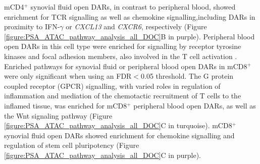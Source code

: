 mCD4$^+$ synovial fluid open DARs, in contrast to peripheral blood, showed enrichment for TCR signalling as well as chemokine signalling,including DARs in proximity to IFN-$\gamma$ or \textit{CXCL13} and \textit{CXCR6}, respectively (Figure \ref{figure:PSA_ATAC_pathway_analysis_all_DOC}B in purple). Peripheral blood open DARs in this cell type were enriched for signalling by receptor tyrosine kinases and focal adhesion members, also involved in the T cell activation \parencite{Dustin2001}. Enriched pathways for synovial fluid or peripheral blood open DARs in mCD8$^+$ were only significant when using an FDR$<$0.05 threshold. The G protein coupled receptor (GPCR) signalling, with varied roles in regulation of inflammation and mediation of the chemotactic recruitment of T cells to the inflamed tissue, was enriched for mCD8$^+$ peripheral blood open DARs, as well as the Wnt signaling pathway %
(Figure \ref{figure:PSA_ATAC_pathway_analysis_all_DOC}C in turquoise). mCD8$^+$ synovial fluid open DARs showed enrichment for chemokine signalling and regulation of stem cell pluripotency (Figure \ref{figure:PSA_ATAC_pathway_analysis_all_DOC}C in purple).  



